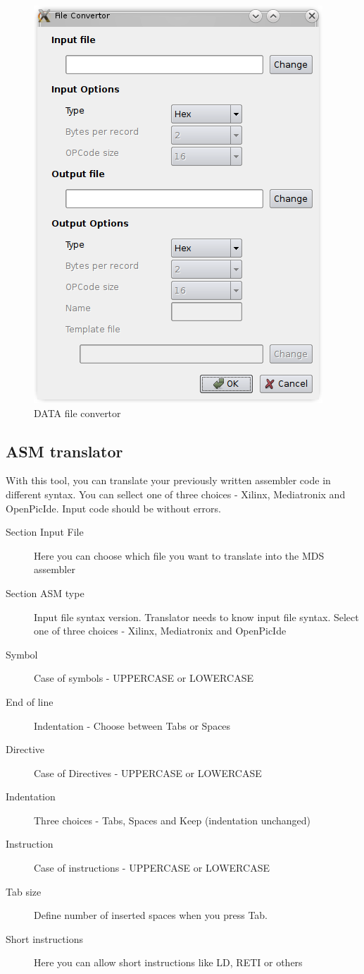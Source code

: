     \begin{figure}
        \centering{}
        \includegraphics [scale=1]{img/DATA_convertor.png}
        \caption{DATA file convertor}
    \end{figure}

\subsection{ASM translator}
    With this tool, you can translate your previously written assembler code in different syntax.
    You can sellect one of three choices - Xilinx, Mediatronix and OpenPicIde. Input code should be without
    errors.
    \begin{description}
        \item[Section Input File] Here you can choose which file you want to translate into the MDS assembler
        \item[Section ASM type] Input file syntax version. Translator needs to know input file syntax. Select one of three choices - Xilinx, Mediatronix and OpenPicIde
        \item[Symbol] Case of symbols - UPPERCASE or LOWERCASE
        \item[End of line] Indentation - Choose between Tabs or Spaces
        \item[Directive] Case of Directives - UPPERCASE or LOWERCASE
        \item[Indentation] Three choices - Tabs, Spaces and Keep (indentation unchanged)
        \item[Instruction] Case of instructions - UPPERCASE or LOWERCASE
        \item[Tab size]  Define number of inserted spaces when you press Tab.
        \item[Short instructions] Here you can allow short instructions like LD, RETI or others
    \end{description}

